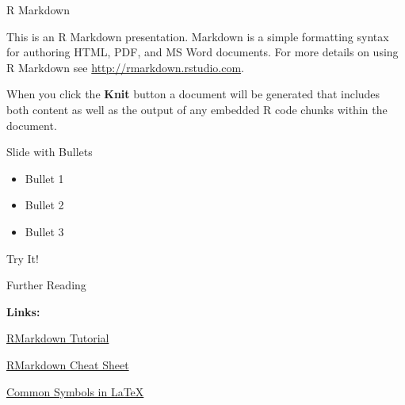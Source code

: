\documentclass[
  ignorenonframetext,
]{beamer}
\providecommand{\tightlist}{%
  \setlength{\itemsep}{0pt}\setlength{\parskip}{0pt}}
\begin{document}
\begin{frame}{R Markdown}
\protect\hypertarget{r-markdown-3}{}

This is an R Markdown presentation. Markdown is a simple formatting
syntax for authoring HTML, PDF, and MS Word documents. For more details
on using R Markdown see \url{http://rmarkdown.rstudio.com}.

When you click the \textbf{Knit} button a document will be generated
that includes both content as well as the output of any embedded R code
chunks within the document.

\end{frame}

\begin{frame}{Slide with Bullets}
\protect\hypertarget{slide-with-bullets-3}{}

\begin{itemize}
\tightlist
\item
  Bullet 1
\item
  Bullet 2
\item
  Bullet 3
\end{itemize}

\end{frame}

\begin{frame}{Try It!}
\protect\hypertarget{try-it}{}

\end{frame}

\begin{frame}{Further Reading}
\protect\hypertarget{further-reading}{}

\textbf{Links:}

\href{https://rmarkdown.rstudio.com/lesson-1.html}{RMarkdown Tutorial}

\href{https://github.com/rstudio/cheatsheets/raw/master/rmarkdown-2.0.pdf}{RMarkdown
Cheat Sheet}

\href{https://artofproblemsolving.com/wiki/index.php/LaTeX:Symbols}{Common
Symbols in \LaTeX}

\end{frame}
\end{document}
